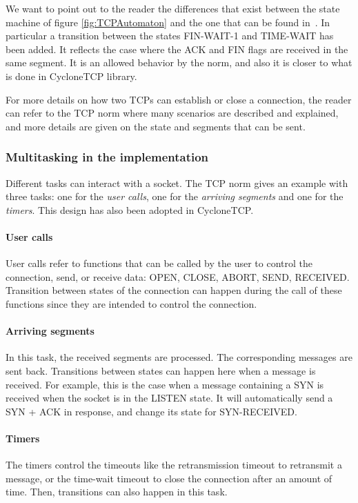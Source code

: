 \documentclass[a4paper, 10pt]{article}
\let\state\textsf
\newcommand\SYNRECEIVED{\state{SYN-RECEIVED}}
\newcommand\LISTEN{\state{LISTEN}}
\newcommand\FINWAITONE{\state{FIN-WAIT-1}}
\newcommand\TIMEWAIT{\state{TIME-WAIT}}
\begin{document}
    \bigskip

    We want to point out to the reader the differences that exist between the state machine
    of figure \ref{fig:TCPAutomaton} and the one that can be found in~\cite[23]{rfc793}. In particular
    a transition between the states \FINWAITONE{} and \TIMEWAIT{} has been added. It reflects the case where
    the ACK and FIN flags are received in the same segment. It is an allowed behavior by the norm, and
    also it is closer to what is done in CycloneTCP library.

    For more details on how two TCPs can establish or close a connection, the reader can refer
    to the TCP norm where many scenarios are described and explained, and more
    details are given on the state and segments that can be sent.


    \subsubsection{Multitasking in the implementation}

    Different tasks can interact with a socket. The TCP norm gives an example with
    three tasks: one for the \emph{user calls}, one for the \emph{arriving segments}
    and one for the \emph{timers}. This design has also been adopted in CycloneTCP.
    
    \paragraph{User calls}
    User calls refer to functions that can be called by the user to control the connection,
    send, or receive data: OPEN, CLOSE, ABORT, SEND, RECEIVED. Transition between states of
    the connection can happen during the call of these functions since they are intended to control
    the connection.

    \paragraph{Arriving segments}
    In this task, the received segments are processed. The corresponding messages are sent back.
    Transitions between states can happen here when a message is received. For example,
    this is the case when a message containing a SYN is received when the socket is in
    the \LISTEN{} state. It will automatically send a SYN + ACK in response, and change
    its state for \SYNRECEIVED.

    \paragraph{Timers}
    The timers control the timeouts like the retransmission timeout to retransmit a message, or
    the time-wait timeout to close the connection after an amount of time. Then, transitions can also
    happen in this task.
\end{document}

